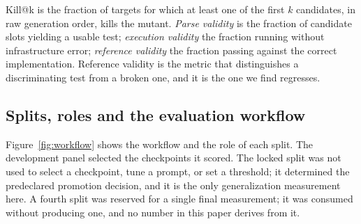 \documentclass[10pt,conference,letterpaper]{IEEEtran}
\makeatletter
\newcommand{\killk}[1]{Kill@#1}
\makeatother
\begin{document}
\killk{k} is the fraction of targets for which at least one of the first $k$
candidates, in raw generation order, kills the mutant. \emph{Parse validity} is
the fraction of candidate slots yielding a usable test; \emph{execution
validity} the fraction running without infrastructure error; \emph{reference
validity} the fraction passing against the correct implementation. Reference
validity is the metric that distinguishes a discriminating test from a broken
one, and it is the one we find regresses.

\subsection{Splits, roles and the evaluation workflow}

Figure~\ref{fig:workflow} shows the workflow and the role of each split. The
development panel selected the checkpoints it scored. The locked split was not
used to select a checkpoint, tune a prompt, or set a threshold; it determined the
predeclared promotion decision, and it is the only generalization measurement
here. A fourth split was
reserved for a single final measurement; it was consumed without producing one,
and no number in this paper derives from it.
\end{document}
